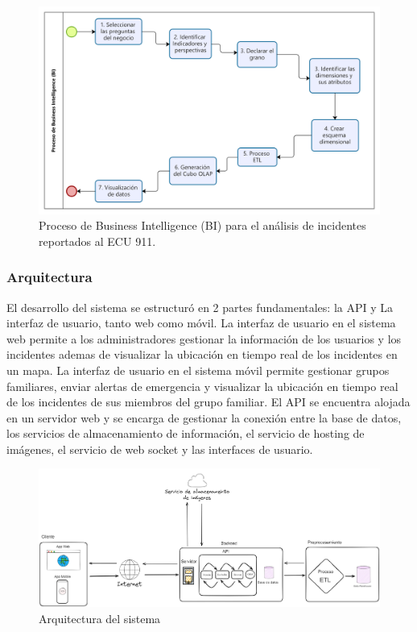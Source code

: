 \begin{figure}[H]
    \centering
    \includegraphics[width=1\textwidth]{chapters/III-resultados-y-discusion/resources/images/proceso-bi.png}
    \caption{Proceso de Business Intelligence (BI) para el análisis de incidentes reportados al ECU 911.}
    \label{fig:proceso-bi}
\end{figure}

\subsubsection{Arquitectura}

El desarrollo del sistema se estructuró en 2 partes fundamentales: la API y La interfaz de usuario, tanto web como móvil.
La interfaz de usuario en el sistema web permite a los administradores gestionar la información de los usuarios y los incidentes
ademas de visualizar la ubicación en tiempo real de los incidentes en un mapa. La interfaz de usuario en el sistema móvil
permite gestionar grupos familiares, enviar alertas de emergencia y visualizar la ubicación en tiempo real de los incidentes de sus
miembros del grupo familiar. El API se encuentra alojada en un servidor web y se encarga de gestionar la conexión entre la base de
datos, los servicios de almacenamiento de información, el servicio de hosting de imágenes, el servicio de web socket y las interfaces
de usuario.

\begin{figure}[H]
    \centering
    \includegraphics[width=1.1\textwidth]{chapters/III-resultados-y-discusion/resources/images/arquitectura.png}
    \caption{Arquitectura del sistema}
    \label{fig:arquitectura}
\end{figure}


